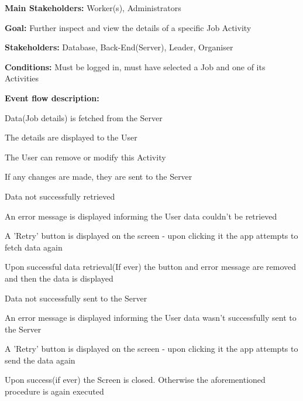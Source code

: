 			\noindent {}
			\begin{packed_item}
				\item \textbf{Main Stakeholders:} Worker(s), Administrators
				\item \textbf{Goal:} Further inspect and view the details of a specific Job Activity
				\item \textbf{Stakeholders: } Database, Back-End(Server), Leader, Organiser
				\item \textbf{Conditions: } Must be logged in, must have selected a Job and one of its Activities
				\item \textbf{Event flow description: }
				\begin{packed_enum}
					\item Data(Job details) is fetched from the Server
					\item The details are displayed to the User
					\item The User can remove or modify this Activity
					\item If any changes are made, they are sent to the Server
				\end{packed_enum}
				
				\begin{packed_item}
					\item[1.a] Data not successfully retrieved
					\item[] \begin{packed_enum}
						\item An error message is displayed informing the User data couldn't be retrieved
						\item A 'Retry' button is displayed on the screen - upon clicking it the app attempts to fetch data again
						\item Upon successful data retrieval(If ever) the button and error message are removed and then the data is displayed
					\end{packed_enum}
				
					\item[3.a] Data not successfully sent to the Server
					\item[] \begin{packed_enum}
						\item An error message is displayed informing the User data wasn't successfully sent to the Server
						\item A 'Retry' button is displayed on the screen - upon clicking it the app attempts to send the data again
						\item Upon success(if ever) the Screen is closed. Otherwise the aforementioned procedure is again executed
					\end{packed_enum}
				\end{packed_item}
			\end{packed_item}

